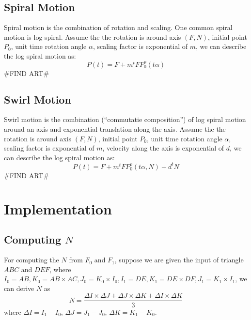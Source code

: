 \documentclass[twoside,11pt]{article}
\begin{document}
\subsection{Spiral Motion}
Spiral motion is the combination of rotation and scaling. One common spiral motion is log spiral. Assume the the rotation is around axis $(F, N)$, initial point $P_0$, unit time rotation angle $\alpha$, scaling factor is exponential of $m$, we can describe the log spiral motion as:
\begin{equation}
P(t) = F + m^t FP_0^o(t\alpha)
\end{equation}
\#FIND ART\#

\subsection{Swirl Motion}
Swirl motion is the combination (``commutatie composition'') of log spiral motion around an axis and exponential translation along the axis. Assume the the rotation is around axis $(F, N)$, initial point $P_0$, unit time rotation angle $\alpha$, scaling factor is exponential of $m$, velocity along the axis is exponential of $d$, we can describe the log spiral motion as:
\begin{equation}
P(t) = F + m^t FP_0^o(t\alpha, N) + d^t N
\end{equation}
\#FIND ART\#

\section{Implementation}


\subsection{Computing $N$}

For computing the $N$ from $F_0$ and $F_1$, suppose we are given the input of triangle $ABC$ and $DEF$, where $I_0 = AB, K_0 = AB \times AC, J_0 = K_0 \times I_0, I_1 = DE, K_1 =  DE \times DF, J_1 = K_1 \times I_1$, we can derive $N$ as
\begin{equation}
N = \frac{\Delta I \times \Delta J + \Delta J \times \Delta K + \Delta I \times \Delta K}{3}
\end{equation}
where $\Delta I = I_1 - I_0$, $\Delta J = J_1 - J_0$, $\Delta K = K_1 - K_0$.
\end{document}
